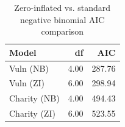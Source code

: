 \begin{table}[ht]
\centering
\begin{tabular}{lrr}
  \hline
Model & df & AIC \\ 
  \hline
Vuln (NB) & 4.00 & 287.76 \\ 
  Vuln (ZI) & 6.00 & 298.94 \\ 
  Charity (NB) & 4.00 & 494.43 \\ 
  Charity (ZI) & 6.00 & 523.55 \\ 
   \hline
\end{tabular}
\caption{Zero-inflated vs. standard negative binomial AIC comparison} 
\end{table}
